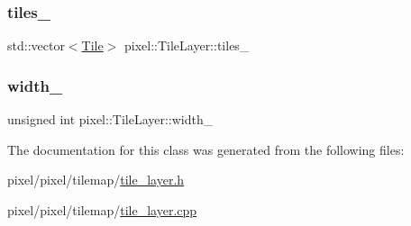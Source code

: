 \mbox{\label{classpixel_1_1_tile_layer_ab94b13dc20c47ddf7e26546bdcfff497}} 
\subsubsection{\texorpdfstring{tiles\+\_\+}{tiles\_}}
{\footnotesize\ttfamily std\+::vector$<$\hyperlink{structpixel_1_1_tile_layer_1_1_tile}{Tile}$>$ pixel\+::\+Tile\+Layer\+::tiles\+\_\+\hspace{0.3cm}{\ttfamily [private]}}

\mbox{\label{classpixel_1_1_tile_layer_a5a2c300689cf5fd25f44eea6b1ac5cd7}} 
\subsubsection{\texorpdfstring{width\+\_\+}{width\_}}
{\footnotesize\ttfamily unsigned int pixel\+::\+Tile\+Layer\+::width\+\_\+\hspace{0.3cm}{\ttfamily [private]}}



The documentation for this class was generated from the following files\+:\begin{DoxyCompactItemize}
\item 
pixel/pixel/tilemap/\hyperlink{tile__layer_8h}{tile\+\_\+layer.\+h}\item 
pixel/pixel/tilemap/\hyperlink{tile__layer_8cpp}{tile\+\_\+layer.\+cpp}\end{DoxyCompactItemize}
